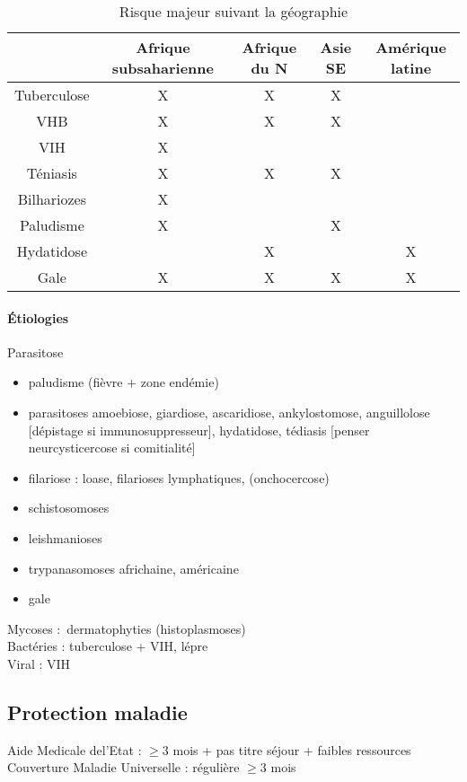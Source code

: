 \begin{table}[htpb]
  \centering
  \caption{Risque majeur suivant la géographie}
  \begin{tabular}{*{5}{c}}
  \toprule
               & Afrique subsaharienne & Afrique du N & Asie SE & Amérique latine \\
  \midrule
 Tuberculose   & X                     & X            & X\\
    VHB
               & X                     & X            & X\\
 VIH           & X \\
 Téniasis      & X                     & X            & X\\
 Bilhariozes   & X \\
 Paludisme     & X                     &              & X \\
 Hydatidose    &                       & X            &         & X\\
 Gale          & X                     & X            & X       & X \\
  \bottomrule
  \end{tabular}
\end{table}

\paragraph{Étiologies} 
Parasitose
\begin{itemize}
  \item paludisme (fièvre + zone endémie)
  \item parasitoses amoebiose, giardiose, ascaridiose, ankylostomose,
    anguillolose [dépistage si immunosuppresseur], hydatidose, tédiasis
    [penser neurcysticercose si comitialité]
  \item filariose : loase, filarioses lymphatiques, (onchocercose)
  \item schistosomoses
  \item leishmanioses
  \item trypanasomoses africhaine, américaine
  \item gale
\end{itemize}
Mycoses : dermatophyties (histoplasmoses)\\
Bactéries : tuberculose + VIH, lépre\\
Viral : VIH\\

\subsection{Protection maladie}
Aide Medicale del'Etat : $\ge 3$ mois + pas titre séjour + faibles ressources \\
Couverture Maladie Universelle : régulière $\ge 3$ mois 

